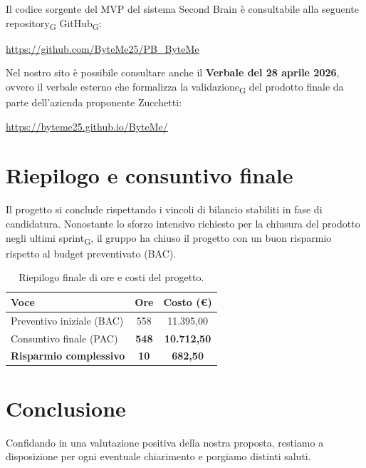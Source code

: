 \documentclass[11pt,a4paper]{article}
\newcommand{\gls}[1]{#1\textsubscript{G}}
\begin{document}
Il codice sorgente del MVP del sistema Second Brain è consultabile alla seguente \gls{repository} \gls{GitHub}:
\begin{center}
 \url{https://github.com/ByteMe25/PB_ByteMe}
\end{center}

Nel nostro sito è possibile consultare anche il \textbf{Verbale del 28 aprile 2026}, ovvero il verbale esterno che formalizza la \gls{validazione} del prodotto finale da parte dell'azienda proponente Zucchetti:
\begin{center}
 \url{https://byteme25.github.io/ByteMe/}
\end{center}

\newpage

\section{Riepilogo e consuntivo finale}
Il progetto si conclude rispettando i vincoli di bilancio stabiliti in fase di candidatura. Nonostante lo sforzo intensivo richiesto per la chiusura del prodotto negli ultimi \gls{sprint}, il gruppo ha chiuso il progetto con un buon risparmio rispetto al budget preventivato (BAC).

\begin{table}[H]
    \centering
    \renewcommand{\arraystretch}{1.3}
    \begin{tabular}{|l|c|c|}
        \hline
        \textbf{Voce} & \textbf{Ore} & \textbf{Costo (€)} \\
        \hline
        Preventivo iniziale (BAC) & 558 & 11.395,00 \\
        Consuntivo finale (PAC) & \textbf{548} & \textbf{10.712,50} \\
        \hline
        \textbf{Risparmio complessivo} & \textbf{10} & \textbf{682,50} \\
        \hline
    \end{tabular}
    \vspace{0.2cm}
    \caption{Riepilogo finale di ore e costi del progetto.}
\end{table}


\section{Conclusione}
Confidando in una valutazione positiva della nostra proposta, restiamo a disposizione per ogni eventuale chiarimento e porgiamo distinti saluti.
\end{document}
